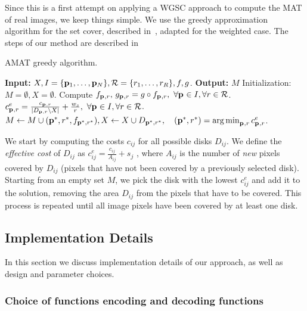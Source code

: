 \documentclass[10pt,twocolumn,letterpaper]{article}
\begin{document}
Since this is a first attempt on applying a WGSC approach to compute the MAT of real images, we keep things simple.
We use the greedy approximation algorithm for the set cover, described in~\cite{vazirani2013approximation},
adapted for the weighted case.
The steps of our method are described in~
\begin{algorithm}
\caption{AMAT greedy algorithm.}
\label{alg:greedy}
	\begin{algorithmic}[1]
	\Statex \textbf{Input:} $X,I=\{\mathbf{p}_{1},\ldots,\mathbf{p}_{N}\},\mathcal{R}=\{r_1,\ldots,r_R\},f,g$.
	\Statex \textbf{Output:} $M$
	\State Initialization: $M = \emptyset,X=\emptyset$.
	\State Compute $f_{\mathbf{p}_{},r},\, g_{\mathbf{p}_{},r} = g \circ f_{\mathbf{p}_{},r},\,\, \forall \mathbf{p}_{} \in I, \forall r \in \mathcal{R}$.
		\State $c_{\mathbf{p}_{},r}^e = \frac{c_{\mathbf{p}_{},r}}{|D_{\mathbf{p}_{},r} \setminus X|}+\frac{w_s}{r},\,\, \forall \mathbf{p}_{} \in I, \forall r \in \mathcal{R}$.		
		\State $M\leftarrow M\cup{(\p{}^{*},r^{*},f_{\p{}^{*},r^{*}})},  \newline
				X \leftarrow X\cup D_{\p{}^{*},r^{*}}, \quad (\p{}^{*},r^{*}) = \argmin_{\p{},r}{c_{\p{},r}^e}$.		
	\EndWhile
	\end{algorithmic}
\end{algorithm}
We start by computing the costs $c_{ij}$ for all possible disks $D_{ij}$.
We define the \emph{effective cost} of $D_{ij}$ as $c_{ij}^e = \frac{c_{ij}}{A_{ij}} + s_j$ , where $A_{ij}$ is the number
of \emph{new} pixels covered by $D_{ij}$ (pixels that have not been covered by a previously selected disk).
Starting from an empty set $M$, we pick the disk with the lowest $c_{ij}^e$ and add it to the solution, 
removing the area $D_{ij}$ from the pixels that have to be covered.
This process is repeated until all image pixels have been covered by at least one disk.

 
\subsection{Implementation Details}\label{sec:implementation}
In this section we discuss implementation details of our approach, as well as design and parameter choices.
\subsubsection*{Choice of functions encoding and decoding functions}
\end{document}
